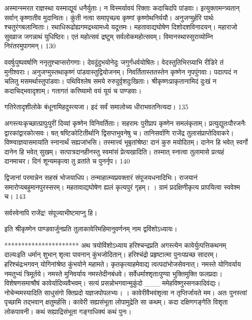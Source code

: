 अस्मान्स्मरत राज्ञस्था यस्माद्यूयं धनैर्युताः।
न विस्मर्यावयं रिक्ताः कदाचिदपि पांडवाः।
इत्युक्तामन्त्र्यतान् सर्वान् कृष्णातीव मुदान्वितः।
कुंती नत्वा समापृच्छ्य कृष्णां कृष्णोथनिर्ययौ।
अनुजग्मुर्हरि पार्थः श्चतुरंगबलान्विताः।
रथाधिरूढोह्यगमद्रथ्यामध्ये यदूत्तमः।
महतावाद्यघोषेण दिशोदशविनादयन्।
महाराजो सुवव्राज जगन्नाथं युधिष्ठिरः।
एतं महोत्सवं द्रष्टुम् सर्वलोकमहोत्सवम्।
विमानस्थास्सुराव्योम्नि निरंतरमुपागमन्।
130

ववर्षुःपुष्पवर्षाणि ननृतुश्चाप्सरोगणाः।
देवदुंदुभयोनेदुः जगुर्गंधर्वयोषितः।
वेदस्तुतिभिरग्र्याभि रीडिरे तं मुनीश्वराः।
अनुजग्मुस्तथाकृष्णं पांडवास्तुद्वियोजनम्।
निवर्तितास्ततस्तेन कृष्णेन नृपपुंगवाः।
पदात्पदं न चलितु मसमर्थास्तुपांडवाः।
पथिविश्लेष समये रुरुदुर्वृशदुःखिताः।
श्रीकृष्णःप्राकृतानामिदं दुःखं न कदाचिद्भवादृशाम्।
गतागतं करिष्यामो वयं यूयं च पाण्डवाः।

गतिरेतादृशीलोके बंधूनामिहदुस्त्यजा।
इदं सर्वं समालोच्य धीराभवतनित्यदा।
135


अगस्त्यःकृच्छात्प्रापुःपुरीं दिव्यां कृष्णेन विनिवर्तिताः।
सहरामः पुरीप्राप कृष्णेन समलंकृताम्।
प्रत्युद्युतःपौरजनैः द्वारकांद्वारकोत्सवः।
षत् षष्टिकोटितीर्थानि द्विसप्तभुवनेषु च।
तानिसर्वाणि राजेंद्र तुलासंप्राप्तेदिवाकरे।
विष्ण्वाज्ञयासमायांति स्नानार्थं सह्यजांभसि।
तस्मात्त्वं भूबृतांश्रेष्ठ! दानं कुरु मयोदितम्।
दानेन हि भवेत् स्वर्गो दानेन हि भवेत् सुखम्।
सत्पात्रदानहीनस्तु स्वमांसं प्रेत्यखादिति।
तस्मात् स्नात्वा तुलामासे प्रत्यहं दानमाचर।
दिनं शून्यमकृत्वा तु व्रतांते च पुनर्नृप।
140

द्विजानां परमान्नेन सहस्रं भोजयाधिप।
तन्माहात्म्यप्रवक्तारं संपूजयधनादिभिः।
राजयानं समारोप्यबहुमानपुरस्सरम्।
महतावाद्यघोषेण ह्यलं कृत्यपुरं गृहम्।
।
ग्रामं प्रदक्षिणीकृत्य प्रापयित्वा स्ववेश्म च।
143

सर्वस्वेनापि राजेंद्र! संपूज्याभीष्टमाप्नु हि।

इति श्रीकृष्णेन पाण्डवार्जुनप्रति तुलाकावेरिमहिमानुवर्णनम् नाम द्वविंशोऽध्यायः।

**********************
अथ त्रयोविंशोऽध्याय हरिश्चन्द्रप्रति अगस्त्येन कावेर्युत्पत्तिकथनम् दाल्यःइति धर्मान् शुभान् शृत्वा पावनान् कुंभजोदितान्।
हरिश्चंद्रो प्रहृष्टात्मा पुनःपप्रच्छ सादरम्।
हरिश्चंद्रःभगवन् योगिनांश्रेष्ठ कुंभयोने महामते।
कृतकृत्याहमेवाद्य त्वत्पदांभोजसेवनात्।
नमस्ते योगिवर्याय नमतुभ्यं त्रिमूर्तये।
नमस्ते मुनिवर्याय नमस्तेदीनबंधवे।
सर्वेधर्माश्शृताःपुण्या भुक्तिमुक्ति फलप्रदाः।
विशेषणसमाश्रौषं कावेर्यादिव्यवैभवम्।
सत्यं प्रसन्नोभगवान्मुकुंदो
___ ममेहविष्णुस्सनकादिवंद्यः।
नोचेन्ममस्यादिति साधुसंगो
क्तिप्रदो यज्ञजपोपलभ्यः।
।
कावेरीवैभवंशृत्वा न तृप्तिर्जायते मम।
अतः पुनस्त्वां पृच्छामि तद्भवान् क्षतुमर्हसि।
कावेरी सह्यसंभूता लोपामुद्रेति सा कथम्।
कदा दक्षिणगङ्गेति विशृता लोकपावनी।
कथं सह्याद्रिसंभूता गङ्गाधिक्यं कथं पुनः।

